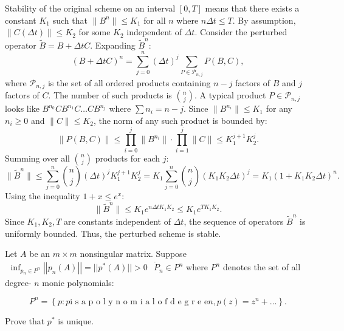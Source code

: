 \begin{solution}
Stability of the original scheme on an interval $[0, T]$ means that there exists a constant $K_1$ such that $\|B^n\| \leq K_1$ for all $n$ where $n \Delta t \leq T$.
By assumption, $\|C(\Delta t)\| \leq K_2$ for some $K_2$ independent of $\Delta t$.
Consider the perturbed operator $\tilde{B} = B + \Delta t C$. Expanding $\tilde{B}^n$:
\[
(B + \Delta t C)^n = \sum_{j=0}^n (\Delta t)^j \sum_{P \in \mathcal{P}_{n,j}} P(B, C),
\]
where $\mathcal{P}_{n,j}$ is the set of all ordered products containing $n-j$ factors of $B$ and $j$ factors of $C$. The number of such products is $\binom{n}{j}$.
A typical product $P \in \mathcal{P}_{n,j}$ looks like $B^{n_0} C B^{n_1} C \dots C B^{n_j}$ where $\sum n_i = n-j$.
Since $\|B^{n_i}\| \leq K_1$ for any $n_i \geq 0$ and $\|C\| \leq K_2$, the norm of any such product is bounded by:
\[
\|P(B, C)\| \leq \prod_{i=0}^j \|B^{n_i}\| \cdot \prod_{i=1}^j \|C\| \leq K_1^{j+1} K_2^j.
\]
Summing over all $\binom{n}{j}$ products for each $j$:
\[
\|\tilde{B}^n\| \leq \sum_{j=0}^n \binom{n}{j} (\Delta t)^j K_1^{j+1} K_2^j = K_1 \sum_{j=0}^n \binom{n}{j} (K_1 K_2 \Delta t)^j = K_1 (1 + K_1 K_2 \Delta t)^n.
\]
Using the inequality $1+x \leq e^x$:
\[
\|\tilde{B}^n\| \leq K_1 e^{n \Delta t K_1 K_2} \leq K_1 e^{T K_1 K_2}.
\]
Since $K_1, K_2, T$ are constants independent of $\Delta t$, the sequence of operators $\tilde{B}^n$ is uniformly bounded. Thus, the perturbed scheme is stable.
\end{solution}

\begin{exercise}
\label{applied:2020:6}
Let $A$ be an $m \times m$ nonsingular matrix. Suppose $\begin{array} { r } { \operatorname* { i n f } _ { p _ { n } \in P ^ { n } } \left| | p _ { n } ( A ) | \right| = | | p ^ { * } ( A ) | | > 0 } \end{array}$ ${ \dot { P } } _ { n } \in P ^ { n }$ where $P ^ { n }$ denotes the set of all degree- $n$ monic polynomials:

\[
P ^ {n} = \left\{p: p \text {i s a p o l y n o m i a l o f d e g r e e} n, p (z) = z ^ {n} + \dots \right\}.
\]

Prove that $p ^ { * }$ is unique.
\end{exercise}


